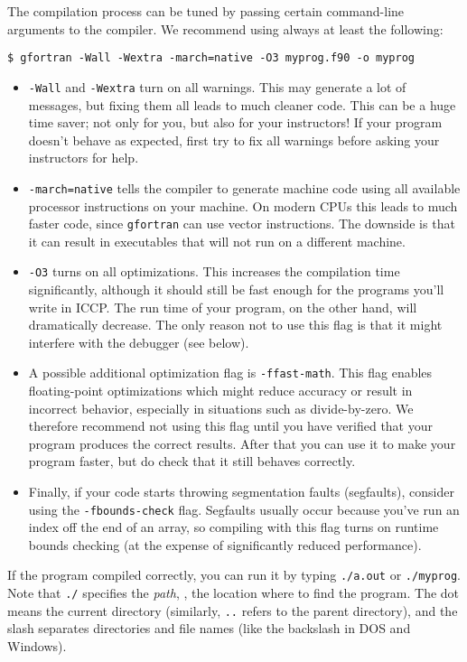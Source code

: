 The compilation process can be tuned by passing certain command-line arguments to the compiler.
We recommend using always at least the following:
\begin{verbatim}
$ gfortran -Wall -Wextra -march=native -O3 myprog.f90 -o myprog
\end{verbatim}
\begin{itemize}
  \item \texttt{-Wall} and \texttt{-Wextra} turn on all warnings.
    This may generate a lot of messages, but fixing them all leads to much cleaner code.
    This can be a huge time saver; not only for you, but also for your instructors!
    If your program doesn't behave as expected, first try to fix all warnings before asking your instructors for help.
  \item \texttt{-march=native} tells the compiler to generate machine code using all available processor instructions on your machine. 
    On modern CPUs this leads to much faster code, since \texttt{gfortran} can use vector instructions.
    The downside is that it can result in executables that will not run on a different machine.
  \item \texttt{-O3} turns on all optimizations.
    This increases the compilation time significantly, although it should still be fast enough for the programs you'll write in ICCP.
    The run time of your program, on the other hand, will dramatically decrease.
    The only reason not to use this flag is that it might interfere with the debugger (see below).
  \item A possible additional optimization flag is \texttt{-ffast-math}.
    This flag enables floating-point optimizations which might reduce accuracy or result in incorrect behavior, especially in situations such as divide-by-zero.
    We therefore recommend not using this flag until you have verified that your program produces the correct results.
    After that you can use it to make your program faster, but do check that it still behaves correctly.
  \item Finally, if your code starts throwing segmentation faults (segfaults), consider using the \texttt{-fbounds-check} flag.
    Segfaults usually occur because you've run an index off the end of an array, so compiling with this flag turns on runtime bounds checking (at the expense of significantly reduced performance).
\end{itemize}
If the program compiled correctly, you can run it by typing \texttt{./a.out} or \texttt{./myprog}.
Note that \texttt{./} specifies the \emph{path}, \ie, the location where to find the program.
The dot means the current directory (similarly, \texttt{..} refers to the parent directory), and the slash separates directories and file names (like the backslash in DOS and Windows).


